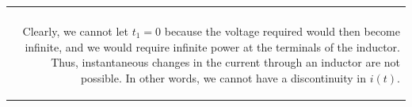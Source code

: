 \documentclass[aspectratio=169]{beamer}
\begin{document}
\begin{frame}[fragile]
\begin{tabular}{r}
\begin{columns}
\begin{column}{.3\textwidth}
		\end{column}
		
		
	\end{columns}\\
	
		\begin{columns}
		\begin{column}{1\textwidth}  %
	\newline 
Clearly, we cannot let $t_{1}=0$ because the voltage required would
then become infinite, and we would require infinite power at the terminals of the inductor. Thus,
instantaneous changes in the current through an inductor are not possible. In other words, we cannot have a discontinuity in $i(t)$.
		\end{column}
	\end{columns}\\
	
\end{tabular}
	
\end{frame}
\end{document}
